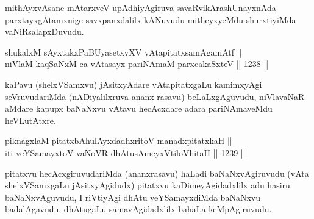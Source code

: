 \begin{artha}
mithAyxvAsane mAtarxveV upAdhiyAgiruva savaRvikArashUnayxnAda parxtayxgAtamxnige savxpanxdalilx kANuvudu mitheyxyeMdu shurxtiyiMda vaNiRsalapxDuvudu.
\end{artha}


\begin{shl}
shukalxM sAyxtakxPaBUyasetxvXV vAtapitatxsamAgamAtf || \\
niVlaM kaqSaNxM ca \footnotemark[1]vAtasayx pariNAmaM parxcakaSxteV \hfill || 1238 ||  
\end{shl}

\begin{artha}
kaPavu (shelxVSamxvu) jAsitxyAdare vAtapitatxgaLu kamimxyAgi seVruvudariMda (nADiyalilxruva ananx rasavu) beLaLxgAguvudu, niVlavaNaR aMdare kapupx baNaNxvu vAtavu hecAcxdare adara pariNAmaveMdu heVLutAtxre.
\end{artha}

\begin{shl}
piknagxlaM pitatxbAhulAyxdadhxritoV manadxpitatxkaH || \\
iti veYSamayxtoV vaNoVR dhAtusAmeyxV\s tiloVhitaH \hfill || 1239 ||  
\end{shl}

\begin{artha}
pitatxvu hecAcxgiruvudariMda (ananxrasavu) haLadi baNaNxvAgiruvudu (vAta shelxVSamxgaLu jAsitxyAgidudx) pitatxvu kaDimeyAgidadxlilx adu hasiru baNaNxvAguvudu, I riVtiyAgi dhAtu veYSamayxdiMda baNaNxvu badalAgavudu, dhAtugaLu samavAgidadxlilx bahaLa keMpAgiruvudu.
\end{artha}

